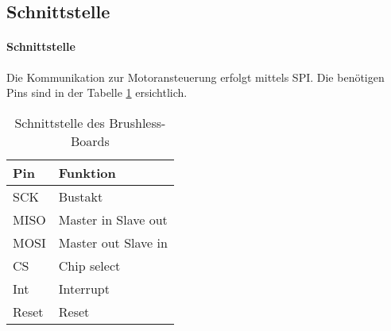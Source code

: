     \subsection{Schnittstelle}
    \fi
    \ifEMBED
    \paragraph{Schnittstelle}$~~$\vspace{2mm}\\
    \fi
        Die Kommunikation zur Motoransteuerung erfolgt mittels SPI. Die benötigen Pins sind in der
        Tabelle \ref{abb:SchnittstelleBrushlessBoard} ersichtlich.
        \begin{table}[h!]
            \begin{tabular}{ll}
                Pin     & Funktion \\
        \hline  SCK     & Bustakt \\
                MISO    & Master in Slave out \\
                MOSI    & Master out Slave in \\
                CS      & Chip select \\
                Int     & Interrupt \\
                Reset   & Reset \\
            \end{tabular}
           	\centering
           	\caption{Schnittstelle des Brushless-Boards} 
            \label{abb:SchnittstelleBrushlessBoard}
        \end{table}
